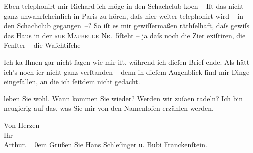 \pstart
           Eben telephonirt mir Richard ich möge in den
                  Schachclub ko{\geminationm}en
               – Iſt das nicht ganz unwahrſcheinlich in Paris zu
               hören, daſs hier weiter telephonirt wird – in den Schachclub gegangen –? So iſt es mir gewiſſermaßen räthſelhaft, daſs gewiſs
               das Haus {\pb}in der \textsc{rue Maubeuge Nr. 5}ſteht – ja daſs noch die Zi{\geminationm}er exiſtiren, die Fenſter – die Waſchtiſche – –\pend
           
\pstart
           Ich ka{\geminationn} Ihnen gar nicht{ }ſagen wie mir iſt, während ich
               dieſen Brief ende. Als hätt ich’s noch i{\geminationm}er nicht ganz
                  verſtanden – denn in
               dieſem Augenblick{ }ſind mir Dinge eingefallen, an die ich{ }ſeitdem nicht gedacht.\pend
           
\pstart
           {\pb}leben Sie wohl. Wann kommen Sie wieder? Werden wir
                  zuſa{\geminationm}en radeln? Ich bin neugierig auf das, was Sie
               mir von den Namenloſen erzählen werden.\pend
           
\pstart
           Von Herzen{\\[\baselineskip]}Ihr{\\[\baselineskip]}\spacefill\mbox{Arthur.}\pend
           \leftskip=0em{}
\pstart
           Grüßen Sie Hans Schleſinger u. Bubi Franckenſtein.\pend
           \endnumbering{}  \newcommand{\dateiname}{L01024}\newcommand{\titel}{Arthur Schnitzler an Hugo von Hofmannsthal, 23. 3. 1900}\newcommand{\editorInnen}{Martin Anton Müller und Gerd-Hermann Susen}
